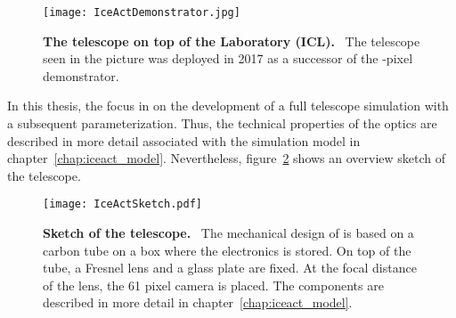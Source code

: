 \begin{figure}[H]
	\centering
	\texttt{[image: IceActDemonstrator.jpg]}
	\caption[The \iceact telescope on top of the \icecube Laboratory (ICL)]{\textbf{The \iceact telescope on top of the \icecube Laboratory (ICL).}~\cite{iceact:picture} The telescope seen in the picture was deployed in 2017 as a successor of the -pixel demonstrator.}
	\label{iceact:picture}
\end{figure}

In this thesis, the focus in on the development of a full telescope simulation with a subsequent parameterization. Thus, the technical properties of the \iceact optics are described in more detail associated with the simulation model in chapter~\ref{chap:iceact_model}. Nevertheless, figure~\ref{iceact:sketch} shows an overview sketch of the \iceact telescope.

\begin{figure}[H]
	\centering
	\texttt{[image: IceActSketch.pdf]}
	\caption[Sketch of the \iceact telescope]{\textbf{Sketch of the \iceact telescope.}~\cite{iceact:erik} The mechanical design of \iceact is based on a carbon tube on a box where the electronics is stored. On top of the tube, a Fresnel lens and a glass plate are fixed. At the focal distance of the lens, the \num{61} pixel camera is placed. The components are described in more detail in chapter~\ref{chap:iceact_model}.}
	\label{iceact:sketch}
\end{figure}